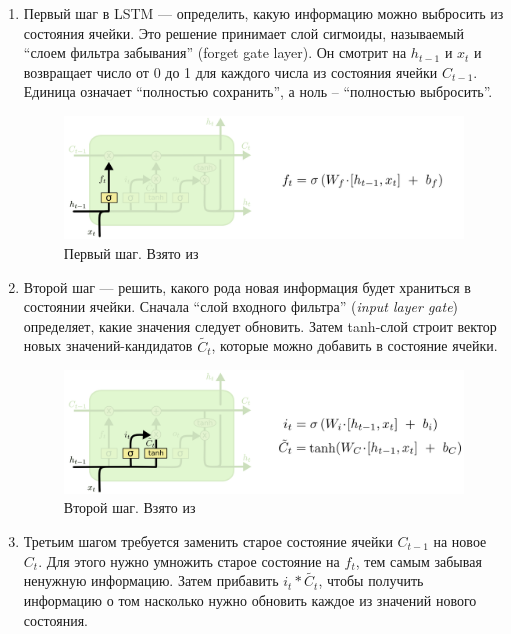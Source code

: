 \documentclass[14pt]{extarticle}
\begin{document}
\begin{enumerate}

\item
Первый шаг в LSTM --- определить, какую информацию можно выбросить из состояния ячейки. Это решение принимает слой сигмоиды, называемый “слоем фильтра забывания” (forget gate layer). Он смотрит на $h_{t-1}$  и $x_t$ и возвращает число от 0 до 1 для каждого числа из состояния ячейки $C_{t-1}$. Единица означает “полностью сохранить”, а ноль – “полностью выбросить”.

\begin{figure}[h]
	\centering
	\includegraphics[width=1\textwidth]{img/LSTM-step_1.png}
	\caption{Первый шаг. Взято из \cite{Colah}}
	\label{fig:lstm-s1}
\end{figure}

\item
Второй шаг --- решить, какого рода новая информация будет храниться в состоянии ячейки. Сначала “слой входного фильтра” ({\it input layer gate}) определяет, какие значения следует обновить. Затем tanh-слой строит вектор новых значений-кандидатов $\widetilde{C_t}$, которые можно добавить в состояние ячейки.

\begin{figure}[h]
	\centering
	\includegraphics[width=1\textwidth]{img/LSTM_step_2.png}
	\caption{Второй шаг. Взято из \cite{Colah}}
	\label{fig:lstm-s2}
\end{figure}

\item
Третьим шагом требуется заменить старое состояние ячейки $C_{t - 1}$  на новое $C_t$. Для этого нужно умножить старое состояние на $f_t$, тем самым забывая ненужную информацию. Затем прибавить $i_t * \widetilde{C_t}$, чтобы получить информацию о том насколько нужно обновить каждое из значений нового состояния.


\end{enumerate}
\end{document}
